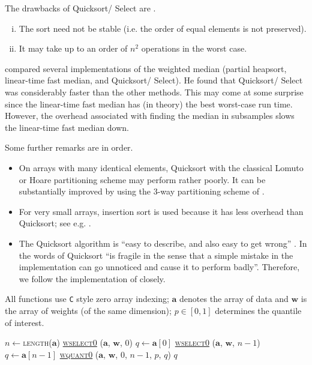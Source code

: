 \documentclass[a4paper,oneside,11pt,DIV=12]{scrartcl}
\newcommand{\code}[1]{{\texttt{#1}}}
\begin{document}
\noindent The drawbacks of Quicksort/ Select are
\citep[][p. 303]{sedgewick_1997}.
\begin{enumerate}[i)]
	\item The sort need not be stable (i.e. the order of equal elements
		is not preserved).
	\item It may take up to an order of $n^2$ operations in the worst case.
\end{enumerate}

\citet{gurwitz_1990} compared several implementations of the weighted
median (partial heapsort, linear-time fast median, and Quicksort/ Select).
He found that Quicksort/ Select was considerably faster than the other
methods. This may come at some surprise since the linear-time fast median
has (in theory) the best worst-case run time. However, the overhead
associated with finding the median in subsamples slows the linear-time
fast median down.

Some further remarks are in order.
\begin{itemize}
	\item On arrays with many identical elements, Quicksort with the
		classical Lomuto or Hoare partitioning scheme may perform rather
		poorly. It can be substantially improved by using the 3-way
		partitioning scheme of \cite{bentley_mcilroy_1993}.
	\item For very small arrays, insertion sort is used because it has
		less overhead than Quicksort; see e.g. \cite[][p. 316]{sedgewick_1997}.
	\item The Quicksort algorithm is ``easy to describe, and also easy
		to get wrong'' \citep[][p. 1252]{bentley_mcilroy_1993}. In the words
		of \citet[][p. 303]{sedgewick_1997} Quicksort ``is fragile in the
		sense that a simple mistake in the implementation can go unnoticed
		and cause it to perform badly''. Therefore, we follow the
		implementation of \citet{bentley_mcilroy_1993} closely.
\end{itemize}

\noindent All functions use \code{C} style zero array indexing; $\bm a$
denotes the array of data and $\bm w$ is the array of weights (of the
same dimension); $p \in [0,1]$ determines the quantile of interest.

\begin{algorithmic}[1]
		\State $n \gets$\textsc{length}($\bm a$)
			\State \hyperlink{alg:wselect0}{\textsc{wselect0}}
				($\bm a$, $\bm w$, $0$)
			\State $q \gets \bm a[0]$
			\State \hyperlink{alg:wselect0}{\textsc{wselect0}}
				($\bm a$, $\bm w$, $n-1$)
			\State $q \gets \bm a[n-1]$
		\Else
			\State \hyperlink{alg:wquant0}{\textsc{wquant0}}
				($\bm a$, $\bm w$, $0$, $n-1$, $p$, $q$)
		\EndIf
		\State \Return $q$
	\EndFunction
\end{algorithmic}
\end{document}
